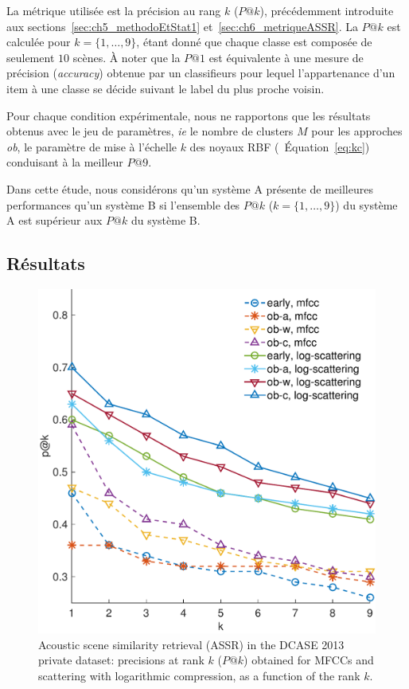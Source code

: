 La métrique utilisée est la précision au rang $k$ ($P@k$), précédemment introduite aux sections~\ref{sec:ch5_methodoEtStat1} et~\ref{sec:ch6_metriqueASSR}. La $P@k$ est calculée pour $k=\lbrace 1,\ldots,9\rbrace$, étant donné que chaque classe est composée de seulement $10$ scènes. À noter que la $P@1$ est équivalente à une mesure de précision (\emph{accuracy}) obtenue par un classifieurs pour lequel l'appartenance d'un item à une classe se décide suivant le label du plus proche voisin.

Pour chaque condition expérimentale, nous ne rapportons que les résultats obtenus avec le jeu de paramètres, \emph{ie} le nombre de clusters $M$ pour les approches \emph{ob}, le paramètre de mise à l'échelle $k$ des noyaux RBF (\cf~Équation~\ref{eq:kc}) conduisant à la meilleur $P@9$.

Dans cette étude, nous considérons qu'un système A présente de meilleures performances qu'un système B si l'ensemble des $P@k$ ($k=\lbrace 1,\ldots,9\rbrace$) du système A est supérieur aux $P@k$ du système B.

\subsection{Résultats}

\begin{figure}[t]
\begin{center}
\includegraphics[width=.9\columnwidth]{gfx/ch_8/unsupervised_test2-eps-converted-to}
\caption{Acoustic scene similarity retrieval (ASSR) in the DCASE 2013 private dataset: precisions at rank $k$ ($P@k$) obtained for MFCCs and scattering with logarithmic compression, as a function of the rank $k$.}
\label{fig:ASS_1}
\end{center}
\end{figure}

